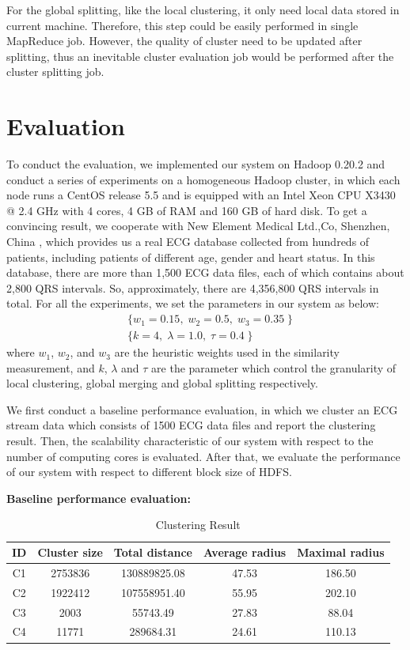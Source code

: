 \documentclass[conference]{IEEEtran}
\begin{document}
For the global splitting, like the local clustering, it only need local data stored in current machine. Therefore, this step could be easily performed in single MapReduce job. However, the quality of cluster need to be updated after splitting, thus an inevitable cluster evaluation job would be performed after the cluster splitting job.

\section{Evaluation}
To conduct the evaluation, we implemented our system on Hadoop 0.20.2 and conduct a series of experiments on a homogeneous Hadoop cluster, in which each node runs a CentOS release 5.5 and is equipped with an Intel Xeon CPU X3430 @ 2.4 GHz with 4 cores, 4 GB of RAM and 160 GB of hard disk. To get a convincing result, we cooperate with New Element Medical Ltd.,Co, Shenzhen, China \cite{szxys}, which provides us a real ECG database collected from hundreds of patients, including patients of different age, gender and heart status. In this database, there are more than 1,500 ECG data files, each of which contains about 2,800 QRS intervals. So, approximately, there are 4,356,800 QRS intervals in total. For all the experiments, we set the parameters in our system as below:
\begin{equation}
\begin{aligned}
& \{ w_1=0.15, \; w_2=0.5, \; w_3=0.35 \;  \}\\
& \{ k=4, \; \lambda=1.0, \; \tau=0.4 \;  \} 
\end{aligned}
\end{equation}
where  $ w_1 $, $ w_2 $, and $ w_3 $ are the heuristic weights used in the similarity measurement, and $ k $, $ \lambda $ and $ \tau $ are the parameter which control the granularity of local clustering, global merging and global splitting respectively.


We first conduct a baseline performance evaluation, in which we cluster an ECG stream data which consists of 1500 ECG data files and report the clustering result. Then, the scalability characteristic of our system with respect to the number of computing cores is evaluated. After that, we evaluate the performance of our system with respect to different block size of HDFS. 


\textbf{Baseline performance evaluation:}


\begin{table}[!t]\caption{Clustering Result}
\label{tb_clustering_result}
\centering
\begin{tabular}{|c|c|c|c|c|}
\hline
ID & Cluster size & Total distance & Average radius & Maximal radius\\
\hline
C1 & 2753836 & 130889825.08 & 47.53 & 186.50 \\
C2 & 1922412 & 107558951.40 & 55.95 & 202.10 \\
C3 & 2003 & 55743.49 & 27.83 & 88.04 \\
C4 & 11771 & 289684.31 & 24.61 & 110.13 \\
\hline
\end{tabular}
\end{table}
\end{document}
